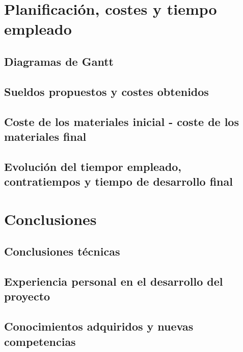 \chapter{Planificación, costes y tiempo empleado}

\section{Diagramas de Gantt}

\section{Sueldos propuestos y costes obtenidos}

\section{Coste de los materiales inicial - coste de los materiales final}

%
\section{Evolución del tiempor empleado, contratiempos y tiempo de desarrollo final}


\chapter{Conclusiones}

\section{Conclusiones técnicas}

\section{Experiencia personal en el desarrollo del proyecto}

\section{Conocimientos adquiridos y nuevas competencias}


